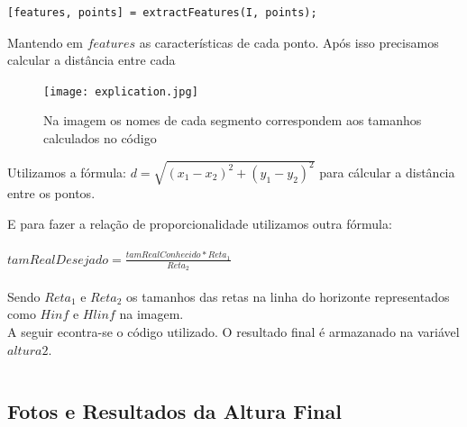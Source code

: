 \documentclass[a4paper, 12pt]{article}
\begin{document}
        \begin{lstlisting}[frame=single]
[features, points] = extractFeatures(I, points);
        \end{lstlisting}

        Mantendo em $features$ as características de cada ponto. Após isso precisamos calcular a distância
        entre cada 

		\begin{figure}[H]
			\centering
			\texttt{[image: explication.jpg]}
			\caption{Na imagem os nomes de cada segmento correspondem aos tamanhos calculados no código}
		\end{figure}

		Utilizamos a fórmula:
		$d = \sqrt {\left( {x_1 - x_2 } \right)^2 + \left( {y_1 - y_2 } \right)^2 }$
		para cálcular a distância entre os pontos.

		E para fazer a relação de proporcionalidade utilizamos outra fórmula:\\
		\\
		$tamRealDesejado = \frac{tamRealConhecido * Reta_1}{Reta_2}$
		\\
		\\
		Sendo $Reta_1$ e $Reta_2$ os tamanhos das retas na linha do horizonte representados como $Hinf$ e $Hlinf$ na imagem.
		\\
		A seguir econtra-se o código utilizado. O resultado final é armazanado na variável $altura2$.
		\begin{lstlisting}[frame=single]

  		\end{lstlisting}

	\subsection*{Fotos e Resultados da Altura Final}
\end{document}
